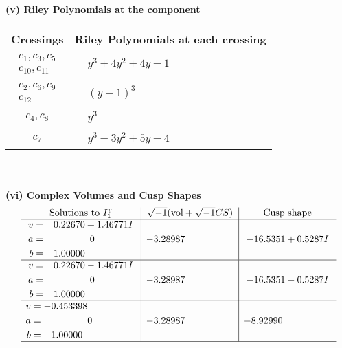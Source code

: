 \documentclass[1p]{elsarticle_modified}
\theoremstyle{definition}
\newcommand{\I}{\sqrt{-1}}
\begin{document}
\flushleft \textbf{(v) Riley Polynomials at the component}\newline \\
\begin{tabular}{m{50pt}|m{274pt}}
Crossings & \hspace{64pt}Riley Polynomials at each crossing \\
\hline $$\begin{aligned}c_{1},c_{3},c_{5}\\c_{10},c_{11}\end{aligned}$$&$\begin{aligned}
&y^3+4 y^2+4 y-1
\end{aligned}$\\
\hline $$\begin{aligned}c_{2},c_{6},c_{9}\\c_{12}\end{aligned}$$&$\begin{aligned}
&(y-1)^3
\end{aligned}$\\
\hline $$\begin{aligned}c_{4},c_{8}\end{aligned}$$&$\begin{aligned}
&y^3
\end{aligned}$\\
\hline $$\begin{aligned}c_{7}\end{aligned}$$&$\begin{aligned}
&y^3-3 y^2+5 y-4
\end{aligned}$\\
\hline
\end{tabular}\\~\\
\newpage\flushleft \textbf{(vi) Complex Volumes and Cusp Shapes}
$$\begin{array}{c|c|c}  
\text{Solutions to }I^v_{1}& \I (\text{vol} + \sqrt{-1}CS) & \text{Cusp shape}\\
 \hline 
\begin{aligned}
v &= \phantom{-}0.22670 + 1.46771 I \\
a &= \phantom{-0.000000 } 0 \\
b &= \phantom{-}1.00000\phantom{ +0.000000I}\end{aligned}
 & -3.28987\phantom{ +0.000000I} & -16.5351 + 0.5287 I \\ \hline\begin{aligned}
v &= \phantom{-}0.22670 - 1.46771 I \\
a &= \phantom{-0.000000 } 0 \\
b &= \phantom{-}1.00000\phantom{ +0.000000I}\end{aligned}
 & -3.28987\phantom{ +0.000000I} & -16.5351 - 0.5287 I \\ \hline\begin{aligned}
v &= -0.453398\phantom{ +0.000000I} \\
a &= \phantom{-0.000000 } 0 \\
b &= \phantom{-}1.00000\phantom{ +0.000000I}\end{aligned}
 & -3.28987\phantom{ +0.000000I} & -8.92990\phantom{ +0.000000I}\\
 \hline 
 \end{array}$$\newpage
\end{document}
